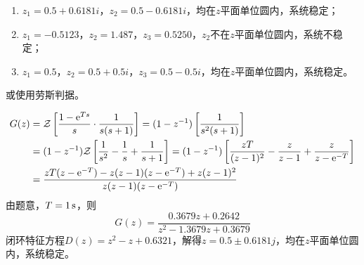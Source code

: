 \begin{exercise} %
    \begin{enumerate}
        \item $z_1 = 0.5+0.6181i$，$z_2 = 0.5-0.6181i$，均在$z$平面单位圆内，系统稳定；
        \item $z_1 = -0.5123$，$z_2 = 1.487$，$z_3 = 0.5250$，$z_2$不在$z$平面单位圆内，系统不稳定；
        \item $z_1 = 0.5$，$z_2 = 0.5+0.5i$，$z_3 = 0.5-0.5i$，均在$z$平面单位圆内，系统稳定。
    \end{enumerate}
    或使用劳斯判据。
\end{exercise}

\begin{exercise} %
    \begin{align*}
        G(z) &= \mathcal{Z}\left[\frac{1-{\rm e}^{Ts}}{s} \cdot \frac{1}{s(s+1)}\right] = (1-z^{-1})\left[\frac{1}{s^2(s+1)}\right] \\
        &= (1-z^{-1})\mathcal{Z}\left[\frac{1}{s^2} - \frac{1}{s} + \frac{1}{s+1}\right] = (1-z^{-1})\left[\frac{zT}{(z-1)^2} - \frac{z}{z-1} + \frac{z}{z-{\rm e}^{-T}}\right] \\
        &= \frac{zT(z-{\rm e}^{-T})-z(z-1)(z-{\rm e}^{-T})+z(z-1)^2}{z(z-1)(z-{\rm e}^{-T})}
    \end{align*}
    由题意，$T=1\,{\rm s}$，则
    \begin{equation*}
        G(z) = \frac{0.3679z + 0.2642}{z^2-1.3679z+0.3679}
    \end{equation*}
    闭环特征方程$D(z) = z^2 - z + 0.6321$，解得$z=0.5 \pm 0.6181j$，均在$z$平面单位圆内，系统稳定。
\end{exercise}

\setcounter{exercise}{7}


